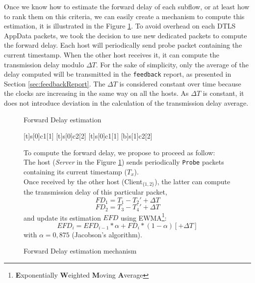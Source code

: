 Once we know how to estimate the forward delay of each subflow, or at least how to rank them on this criteria, we can easily create a mechanism to compute this estimation, it is illustrated in the Figure \ref{fig:forwardDelayComputation}. To avoid overhead on each DTLS AppData packets, we took the decision to use new dedicated packets to compute the forward delay. Each host will periodically send probe packet containing the current timestamp. When the other host receives it, it can compute the transmission delay modulo $\Delta T$. For the sake of simplicity, only the average of the delay computed will be transmitted in the \texttt{feedback} report, as presented in Section \ref{sec:feedbackReport}. The $\Delta T$ is considered constant over time because the clocks are increasing in the same way on all the hosts. As $\Delta T$ is constant, it does not introduce deviation in the calculation of the transmission delay average. 

\begin{figure}[!h]
\begin{minipage}[c]{.55\linewidth}
\begin{msc}[r]{Forward Delay estimation}

\setlength{\instfootheight}{0em}
\setlength{\instheadheight}{0em}
\setlength{\instdist}{0.25\linewidth}
\setlength{\levelheight}{3em}


[t]{s}[0]{c1}[1]
\nextlevel
{}[t]{s}[0]{c2}[2]
\nextlevel
{}[t]{s}[0]{c1}[1]
[b]{s}[1]{c2}[2]
\nextlevel
{}
\nextlevel
{}
\nextlevel
\end{msc}
\caption{Forward Delay estimation mechanism}
\label{fig:forwardDelayComputation}
\end{minipage}
\begin{minipage}[c]{.44\linewidth}
To compute the forward delay, we propose to proceed as follow:\\

The host (\textit{Server} in the Figure \ref{fig:forwardDelayComputation}) sends periodically \texttt{Probe} packets containing its current timestamp ($T_x$).\\

Once received by the other host (Client$_{\{1,2\}}$), the latter can compute the transmission delay of this particular packet,
$$FD_1 = T_1 - T_2' + \Delta{}T$$
$$FD_2 = T_3 - T_4' + \Delta{}T$$
and update its estimation $EFD$ using EWMA\footnote{\textbf{E}xponentially \textbf{W}eighted \textbf{M}oving \textbf{A}verage}:
$$EFD_{i} = EFD_{i-1}*\alpha + FD_i*(1-\alpha) [+ \Delta T]$$
with $\alpha = 0,875$ (Jacobson's algorithm).
\end{minipage}
\end{figure}

